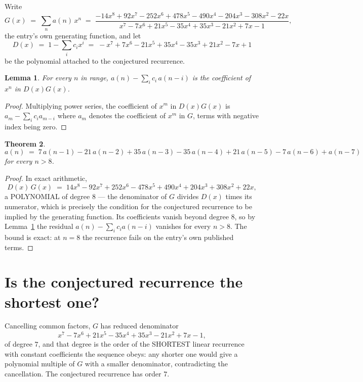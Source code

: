\documentclass[11pt,a4paper]{article}
\theoremstyle{plain}
\newtheorem{theorem}{Theorem}
\newtheorem{lemma}[theorem]{Lemma}
\theoremstyle{definition}
\begin{document}
Write
\[
G(x)\;=\;\sum_{n}a(n)\,x^{n}\;=\;\frac{- 14 x^{8} + 92 x^{7} - 252 x^{6} + 478 x^{5} - 490 x^{4} - 204 x^{3} - 308 x^{2} - 22 x}{x^{7} - 7 x^{6} + 21 x^{5} - 35 x^{4} + 35 x^{3} - 21 x^{2} + 7 x - 1},
\]
the entry's own generating function, and let
\[
D(x)\;=\;1-\sum_i c_i x^{i}\;=\;- x^{7} + 7 x^{6} - 21 x^{5} + 35 x^{4} - 35 x^{3} + 21 x^{2} - 7 x + 1
\]
be the polynomial attached to the conjectured recurrence.

\begin{lemma}\label{lem:key}
For every $n$ in range, $a(n)-\sum_i c_i\,a(n-i)$ is the coefficient of $x^{n}$ in
$D(x)G(x)$.
\end{lemma}

\begin{proof}
Multiplying power series, the coefficient of $x^{m}$ in $D(x)G(x)$ is
$a_m-\sum_i c_i a_{m-i}$ where $a_m$ denotes the coefficient of $x^{m}$ in $G$, terms with
negative index being zero.
\end{proof}

\begin{theorem}
\[
a(n)\;=\;7\,a(n-1) - 21\,a(n-2) + 35\,a(n-3) - 35\,a(n-4) + 21\,a(n-5) - 7\,a(n-6) + a(n-7)
\]
for every $n>8$.
\end{theorem}

\begin{proof}
In exact arithmetic,
\[
D(x)\,G(x)\;=\;14 x^{8} - 92 x^{7} + 252 x^{6} - 478 x^{5} + 490 x^{4} + 204 x^{3} + 308 x^{2} + 22 x,
\]
a POLYNOMIAL of degree $8$ --- the denominator of $G$ divides $D(x)$ times its numerator,
which is precisely the condition for the conjectured recurrence to be implied by the
generating function. Its coefficients vanish beyond degree $8$, so by
Lemma~\ref{lem:key} the residual $a(n)-\sum_ic_ia(n-i)$ vanishes for every
$n>8$. The bound is exact: at $n=8$ the recurrence fails on the entry's own published terms.
\end{proof}

\section{Is the conjectured recurrence the shortest one?}

Cancelling common factors, $G$ has reduced denominator
\[
x^{7} - 7 x^{6} + 21 x^{5} - 35 x^{4} + 35 x^{3} - 21 x^{2} + 7 x - 1,
\]
of degree $7$, and that degree is the order of the SHORTEST linear recurrence with
constant coefficients the sequence obeys: any shorter one would give a polynomial multiple of
$G$ with a smaller denominator, contradicting the cancellation. The conjectured recurrence has
order $7$.
\end{document}
